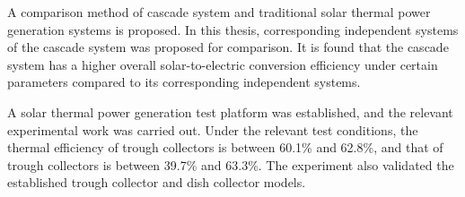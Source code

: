 {A comparison method of cascade system and traditional solar thermal power generation systems is proposed. In this thesis, corresponding independent systems of the cascade system was proposed for comparison. It is found that the cascade system has a higher overall solar-to-electric conversion efficiency under certain parameters compared to its corresponding independent systems.

A solar thermal power generation test platform was established, and the relevant experimental work was carried out. Under the relevant test conditions, the thermal efficiency of trough collectors is between 60.1\% and 62.8\%, and that of trough collectors is between 39.7\% and 63.3\%. The experiment also validated the established trough collector and dish collector models.

%


}
